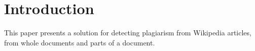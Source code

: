 \section{Introduction}
This paper presents a solution for detecting plagiarism from Wikipedia articles, from whole documents and parts of a document.